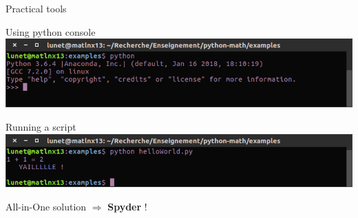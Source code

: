 \documentclass[11pt,unknownkeysallowed,usenames,dvipsnames]{beamer}
\begin{document}
	\begin{frame}{Practical tools}
        \vspace{5pt}
        \begin{block}{Using python console}
        \centering
        \includegraphics[width=0.95\linewidth]{python-terminal}
        \end{block}
        
        \begin{block}{Running a script}
        \centering
        \includegraphics[width=0.95\linewidth]{python-script}
        \end{block}
        \vspace{-10pt}
        \begin{center}
            All-in-One solution $\Rightarrow$ \textbf{Spyder} !
        \end{center}
        \vspace{-10pt}
	\end{frame}
    
\end{document}
